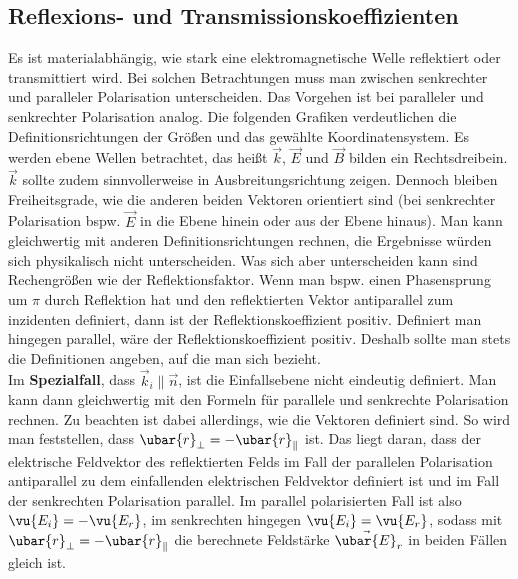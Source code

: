   \subsection{Reflexions- und Transmissionskoeffizienten}
  Es ist materialabhängig, wie stark eine elektromagnetische Welle reflektiert oder transmittiert wird. Bei solchen Betrachtungen muss man zwischen senkrechter und paralleler Polarisation unterscheiden. Das Vorgehen ist bei paralleler und senkrechter Polarisation analog. Die folgenden Grafiken verdeutlichen die Definitionsrichtungen der Größen und das gewählte Koordinatensystem. Es werden ebene Wellen betrachtet, das heißt $\vec{k}$, $\vec{E}$ und $\vec{B}$ bilden ein Rechtsdreibein. $\vec{k}$ sollte zudem sinnvollerweise in Ausbreitungsrichtung zeigen. Dennoch bleiben Freiheitsgrade, wie die anderen beiden Vektoren orientiert sind (bei senkrechter Polarisation bspw. $\vec{E}$ in die Ebene hinein oder aus der Ebene hinaus). Man kann gleichwertig mit anderen Definitionsrichtungen rechnen, die Ergebnisse würden sich physikalisch nicht unterscheiden. Was sich aber unterscheiden kann sind Rechengrößen wie der Reflektionsfaktor. Wenn man bspw. einen Phasensprung um $\pi$ durch Reflektion hat und den reflektierten Vektor antiparallel zum inzidenten definiert, dann ist der Reflektionskoeffizient positiv. Definiert man hingegen parallel, wäre der Reflektionskoeffizient positiv. Deshalb sollte man stets die Definitionen angeben, auf die man sich bezieht. \\
	  
	  Im \textbf{Spezialfall}, dass $\vec{k}_i \parallel \vec{n}$, ist die Einfallsebene nicht eindeutig definiert. Man kann dann gleichwertig mit den Formeln für parallele und senkrechte Polarisation rechnen. Zu beachten ist dabei allerdings, wie die Vektoren definiert sind. So wird man feststellen, dass $\ubar{r}_\perp=-\ubar{r}_\parallel$ ist. Das liegt daran, dass der elektrische Feldvektor des reflektierten Felds im Fall der parallelen Polarisation antiparallel zu dem einfallenden elektrischen Feldvektor definiert ist und im Fall der senkrechten Polarisation parallel. Im parallel polarisierten Fall ist also $\vu{{E_i}}=-\vu{{E_r}}$, im senkrechten hingegen $\vu{{E_i}}=\vu{{E_r}}$, sodass mit $\ubar{r}_\perp=-\ubar{r}_\parallel$ die berechnete Feldstärke $\vec{\ubar{E}}_r$ in beiden Fällen gleich ist.
